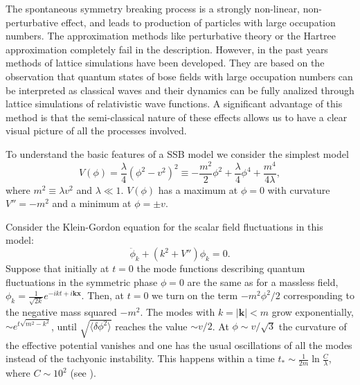 \documentclass[11pt,a4paper,twoside]{book}
\begin{document}
The spontaneous symmetry breaking process is a strongly non-linear, non-perturbative effect, and leads to  production of particles with large occupation numbers. The approximation methods like perturbative theory or the Hartree approximation completely fail in the description. However, in the past years  methods of lattice simulations have been developed. They are based on the observation that quantum states of bose fields with large occupation numbers can be interpreted as classical waves and their dynamics can be fully analized through lattice simulations of relativistic wave functions. A significant advantage of this method is that the semi-classical nature of these effects allows us to have a clear visual picture of all the processes involved.

To understand the basic features of a SSB model we consider the simplest model 
\begin{equation}
	\label{Chap5:TachyonicModel}
V(\phi)=\frac{\lambda}{4}(\phi^{2}-v^{2})^{2} \equiv -\frac{m^{2}}{2}\phi^{2} + \frac{\lambda}{4}\phi^{4} + \frac{m^{4}}{4\lambda},
\end{equation} 
where $ m^{2}\equiv \lambda v^{2} $ and $\lambda \ll 1$. $ V(\phi) $ has a maximum at $ \phi=0 $ with curvature $ V''=-m^{2} $ and a minimum at $\phi=\pm v$.

Consider the Klein-Gordon equation for the scalar field fluctuations in this model:
\begin{equation}
\label{Chap5:TachyonicModel_KGEquation}
\ddot{\phi}_{k} + (k^{2} + V'')\phi_{k}=0.
\end{equation}
Suppose that initially at $ t=0 $  the mode functions describing quantum fluctuations in the symmetric phase $\phi=0$ are the same as for a massless field, $\phi_{k}=\frac{1}{\sqrt{2k}}e^{-ikt + i \textbf{k}\textbf{x}}$. Then, at $ t=0 $ we turn on the term $ -m^{2}\phi^{2}/2 $ corresponding to the negative mass squared $ -m^{2} $. The modes with $ k = |\textbf{k}| < m  $ grow exponentially, $ \sim e^{t\sqrt{m^{2} - k^{2}}} $, until $ \sqrt{\langle \delta \phi^{2}\rangle } $ reaches the value $\sim v/2$.  At $\phi \sim v/\sqrt{3}$ the curvature of the effective potential vanishes and one has the usual oscillations of all the modes instead of the tachyonic instability. This happens within a time $ t_{*} \sim \frac{1}{2m}\ln \frac{C}{\lambda} $, where $ C\sim 10^{2} $ (see  \cite{Chap5:TachyonicInstability}).
\end{document}
